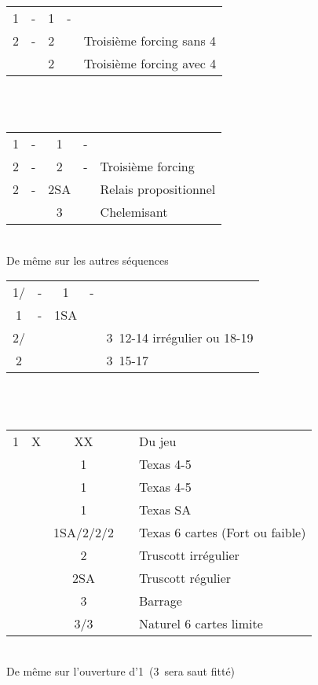 \documentclass[a4paper, oneside, 11pt]{report}
\begin{document}
		\begin{tabular}{cccc|l}
		1\trefle & - & 1\pique & - &\\
		2\trefle & - & 2\carreau && Troisième forcing sans 4\coeur\\
		&& 2\coeur && Troisième forcing avec 4\coeur\\
		\end{tabular}\\\\
			
		\begin{tabular}{cccc|l}
		1\trefle & - & 1\coeur & - &\\
		2\trefle & - & 2\carreau & - & Troisième forcing\\
		2\coeur & - & 2SA && Relais propositionnel\\
		&& 3\coeur &&Chelemisant\\
		\end{tabular}\\
		De même sur les autres séquences

		\begin{tabular}{cccc|l}
		1\trefle/\carreau & - & 1\coeur & - &\\
		1\pique  & - & 1SA &&\\
		2\carreau/\trefle &&&& 3\coeur\ 12-14 irrégulier ou 18-19\\
		2\coeur &&&& 3\coeur\ 15-17\\
		\end{tabular}\\\\

		\begin{tabular}{cccc|l}
		1\trefle & X & XX && Du jeu\\
		&& 1\carreau && Texas 4-5\coeur\\
		&& 1\coeur && Texas 4-5\pique\\
		&& 1\pique && Texas SA\\
		&& 1SA/2\trefle/2\carreau/2\coeur && Texas 6 cartes (Fort ou faible)\\
		&& 2\pique && Truscott irrégulier\\
		&& 2SA && Truscott régulier\\
		&& 3\trefle && Barrage\\
		&& 3\coeur/3\pique && Naturel 6 cartes limite\\
		\end{tabular}\\
		De même sur l'ouverture d'1\carreau\ (3\trefle\ sera saut fitté)\\
\end{document}

